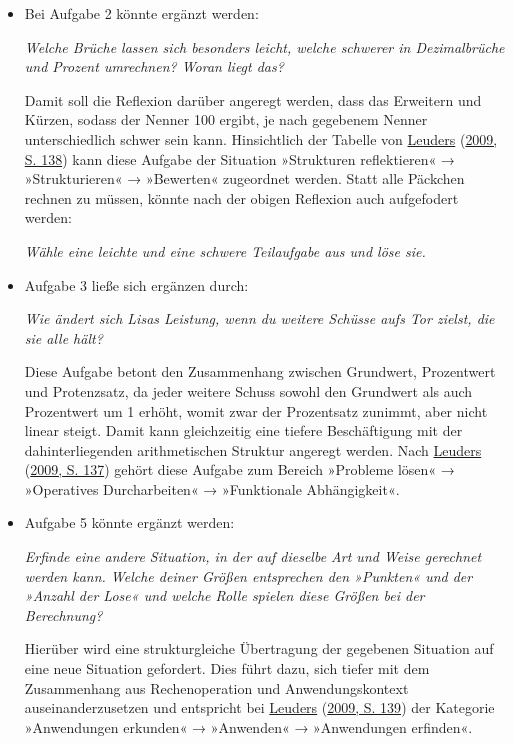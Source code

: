 \documentclass[
  ngerman,
]{scrbook}
\theoremstyle{definition}
\theoremstyle{definition}
\theoremstyle{definition}
\theoremstyle{definition}
\theoremstyle{remark}
\begin{document}
\begin{itemize}
\item
  Bei Aufgabe 2 könnte ergänzt werden:

  \emph{Welche Brüche lassen sich besonders leicht, welche schwerer in Dezimalbrüche und Prozent umrechnen? Woran liegt das?}

  Damit soll die Reflexion darüber angeregt werden, dass das Erweitern und Kürzen, sodass der Nenner 100 ergibt, je nach gegebenem Nenner unterschiedlich schwer sein kann. Hinsichtlich der Tabelle von \protect\hyperlink{ref-Leuders2009}{Leuders} (\protect\hyperlink{ref-Leuders2009}{2009, S. 138}) kann diese Aufgabe der Situation »Strukturen reflektieren« → »Strukturieren« → »Bewerten« zugeordnet werden. Statt alle Päckchen rechnen zu müssen, könnte nach der obigen Reflexion auch aufgefodert werden:

  \emph{Wähle eine leichte und eine schwere Teilaufgabe aus und löse sie.}
\item
  Aufgabe 3 ließe sich ergänzen durch:

  \emph{Wie ändert sich Lisas Leistung, wenn du weitere Schüsse aufs Tor zielst, die sie alle hält?}

  Diese Aufgabe betont den Zusammenhang zwischen Grundwert, Prozentwert und Protenzsatz, da jeder weitere Schuss sowohl den Grundwert als auch Prozentwert um 1 erhöht, womit zwar der Prozentsatz zunimmt, aber nicht linear steigt. Damit kann gleichzeitig eine tiefere Beschäftigung mit der dahinterliegenden arithmetischen Struktur angeregt werden. Nach \protect\hyperlink{ref-Leuders2009}{Leuders} (\protect\hyperlink{ref-Leuders2009}{2009, S. 137}) gehört diese Aufgabe zum Bereich »Probleme lösen« → »Operatives Durcharbeiten« → »Funktionale Abhängigkeit«.
\item
  Aufgabe 5 könnte ergänzt werden:

  \emph{Erfinde eine andere Situation, in der auf dieselbe Art und Weise gerechnet werden kann. Welche deiner Größen entsprechen den »Punkten« und der »Anzahl der Lose« und welche Rolle spielen diese Größen bei der Berechnung?}

  Hierüber wird eine strukturgleiche Übertragung der gegebenen Situation auf eine neue Situation gefordert. Dies führt dazu, sich tiefer mit dem Zusammenhang aus Rechenoperation und Anwendungskontext auseinanderzusetzen und entspricht bei \protect\hyperlink{ref-Leuders2009}{Leuders} (\protect\hyperlink{ref-Leuders2009}{2009, S. 139}) der Kategorie »Anwendungen erkunden« → »Anwenden« → »Anwendungen erfinden«.
\end{itemize}
\end{document}
